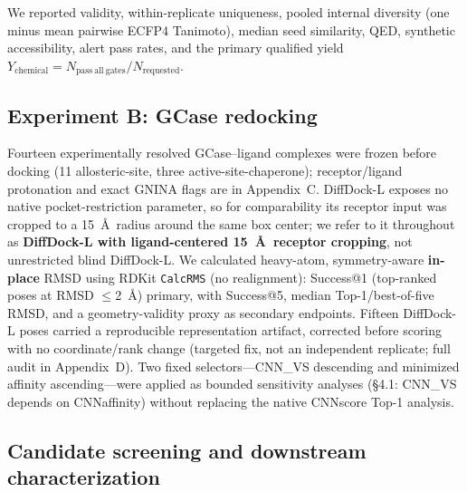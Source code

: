\documentclass{article}
\begin{document}
We reported validity, within-replicate uniqueness, pooled internal diversity (one minus mean pairwise ECFP4 Tanimoto), median seed similarity, QED, synthetic accessibility, alert pass rates, and the primary qualified yield $Y_{\mathrm{chemical}} = N_{\mathrm{pass\ all\ gates}} / N_{\mathrm{requested}}$.

\subsection{Experiment B: GCase redocking}

Fourteen experimentally resolved GCase--ligand complexes were frozen before docking (11 allosteric-site, three active-site-chaperone); receptor/ligand protonation and exact GNINA flags are in Appendix~C. DiffDock-L exposes no native pocket-restriction parameter, so for comparability its receptor input was cropped to a 15~\AA\ radius around the same box center; we refer to it throughout as \textbf{DiffDock-L with ligand-centered 15~\AA\ receptor cropping}, not unrestricted blind DiffDock-L. We calculated heavy-atom, symmetry-aware \textbf{in-place} RMSD using RDKit \texttt{CalcRMS} (no realignment): Success@1 (top-ranked poses at RMSD $\leq$2~\AA) primary, with Success@5, median Top-1/best-of-five RMSD, and a geometry-validity proxy as secondary endpoints. Fifteen DiffDock-L poses carried a reproducible representation artifact, corrected before scoring with no coordinate/rank change (targeted fix, not an independent replicate; full audit in Appendix~D). Two fixed selectors---CNN\_VS descending and minimized affinity ascending---were applied as bounded sensitivity analyses (\S4.1: CNN\_VS depends on CNNaffinity) without replacing the native CNNscore Top-1 analysis.

\subsection{Candidate screening and downstream characterization}
\end{document}
